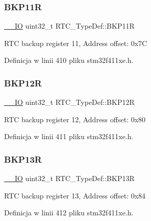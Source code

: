 \subsubsection{\texorpdfstring{B\+K\+P11R}{BKP11R}}
{\footnotesize\ttfamily \hyperlink{core__sc300_8h_aec43007d9998a0a0e01faede4133d6be}{\+\_\+\+\_\+\+IO} uint32\+\_\+t R\+T\+C\+\_\+\+Type\+Def\+::\+B\+K\+P11R}

R\+TC backup register 11, Address offset\+: 0x7C 

Definicja w linii 410 pliku stm32f411xe.\+h.

\mbox{\label{struct_r_t_c___type_def_a6606b5d249f923aa15ab74b382cbaf7e}} 
\subsubsection{\texorpdfstring{B\+K\+P12R}{BKP12R}}
{\footnotesize\ttfamily \hyperlink{core__sc300_8h_aec43007d9998a0a0e01faede4133d6be}{\+\_\+\+\_\+\+IO} uint32\+\_\+t R\+T\+C\+\_\+\+Type\+Def\+::\+B\+K\+P12R}

R\+TC backup register 12, Address offset\+: 0x80 

Definicja w linii 411 pliku stm32f411xe.\+h.

\mbox{\label{struct_r_t_c___type_def_a138903d4681455a660dccbaf3409263d}} 
\subsubsection{\texorpdfstring{B\+K\+P13R}{BKP13R}}
{\footnotesize\ttfamily \hyperlink{core__sc300_8h_aec43007d9998a0a0e01faede4133d6be}{\+\_\+\+\_\+\+IO} uint32\+\_\+t R\+T\+C\+\_\+\+Type\+Def\+::\+B\+K\+P13R}

R\+TC backup register 13, Address offset\+: 0x84 

Definicja w linii 412 pliku stm32f411xe.\+h.

\mbox{\label{struct_r_t_c___type_def_adaae50f5c3213014fb9818eaee389676}} 
